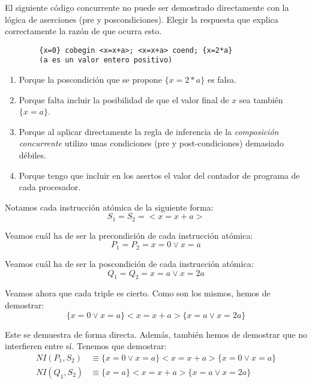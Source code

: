 \begin{ejercicio}
    El siguiente código concurrente no puede ser demostrado directamente con la lógica de aserciones (pre y poscondiciones). Elegir la respuesta que explica correctamente la razón de que ocurra esto.
    \begin{verbatim}
        {x=0} cobegin <x=x+a>; <x=x+a> coend; {x=2*a}
        (a es un valor entero positivo)
    \end{verbatim}
    \begin{enumerate}[label=(\alph*)]
        \item Porque la poscondición que se propone $\{x=2\ast a\}$ es falsa.
        \item Porque falta incluir la posibilidad de que el valor final de $x$ sea también ${\{x=a\}}$.
        \item Porque al aplicar directamente la regla de inferencia de la \textit{composición concurrente} utilizo unas condiciones (pre y post-condiciones) demasiado débiles.
        \item Porque tengo que incluir en los asertos el valor del contador de programa de cada procesador.
    \end{enumerate}

    Notamos cada instrucción atómica de la siguiente forma:
    \begin{equation*}
        S_1 = S_2 = <x=x+a>
    \end{equation*}

    Veamos cuál ha de ser la precondición de cada instrucción atómica:
    \begin{equation*}
        P_1 = P_2 = x=0 \lor x=a
    \end{equation*}

    Veamos cuál ha de ser la poscondición de cada instrucción atómica:
    \begin{equation*}
        Q_1 = Q_2 = x=a \lor x=2a
    \end{equation*}

    Veamos ahora que cada triple es cierto. Como son los mismos, hemos de demostrar:
    \begin{equation*}
        \{x=0 \lor x=a\} <x=x+a> \{x=a \lor x=2a\}
    \end{equation*}
    
    Este se demuestra de forma directa. Además, también hemos de demostrar que no interfieren entre sí. Tenemos que demostrar:
    \begin{align*}
        NI(P_1, S_2) &\equiv \{x=0 \lor x=a\} <x=x+a> \{x=0 \lor x=a\} \\
        NI(Q_1, S_2) &\equiv \{x=a\} <x=x+a> \{x=a \lor x=2a\}
    \end{align*}


\end{ejercicio}
